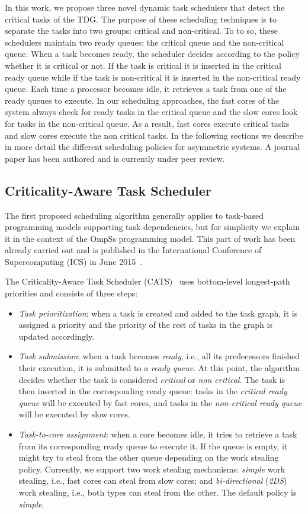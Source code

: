In this work, we propose three novel dynamic task schedulers that detect the critical tasks of the TDG. 
The purpose of these scheduling techniques is to separate the tasks into two groups: critical and non-critical.
To to so, these schedulers maintain two ready queues: the critical queue and the non-critical queue.
When a task becomes ready, the scheduler decides according to the policy whether it is critical or not.
If the task is critical it is inserted in the critical ready queue while if the task is non-critical it is inserted in the non-critical ready queue.
Each time a processor becomes idle, it retrieves a task from one of the ready queues to execute.
In our scheduling approaches, the fast cores of the system always check for ready tasks in the critical queue and the slow cores look for tasks in the non-critical queue.
As a result, fast cores execute critical tasks and slow cores execute the non critical tasks.
In the following sections we describe in more detail the different scheduling policies for asymmetric systems.
A journal paper has been authored and is currently under peer review.

\subsection{Criticality-Aware Task Scheduler}
\label{sec:cats}
The first proposed scheduling algorithm generally applies to task-based programming models supporting task dependencies, but for simplicity we explain it in the context of the OmpSs programming model.
This part of work has been already carried out and is published in the International Conference of Supercomputing (ICS) in June 2015~\cite{Chronaki:ICS2015}.

The Criticality-Aware Task Scheduler (CATS)~\cite{Chronaki:ICS2015} uses bottom-level longest-path priorities and consists of three steps:
\begin{itemize}
 \item{\textit{Task prioritization}: when a task is created and added to the task graph, it is assigned a priority and the priority of the rest of tasks in the graph is updated accordingly.}
 \item{\textit{Task submission}: when a task becomes \textit{ready}, i.e., all its predecessors finished their execution, it is submitted to a \textit{ready queue}. At this point, the algorithm decides whether the task is considered \textit{critical} or \textit{non critical}. The task is then inserted in the corresponding ready queue: tasks in the \textit{critical ready queue} will be executed by fast cores, and tasks in the \textit{non-critical ready queue} will be executed by slow cores.}
 \item{\textit{Task-to-core assignment}: when a core becomes idle, it tries to retrieve a task from its corresponding ready queue to execute it. If the queue is empty, it might try to steal from the other queue depending on the work stealing policy. Currently, we support two work stealing mechanisms: \textit{simple} work stealing, i.e., fast cores can steal from slow cores; and \textit{bi-directional} (\textit{2DS}) work stealing, i.e., both types can steal from the other. The default policy is \textit{simple}.}
\end{itemize}


